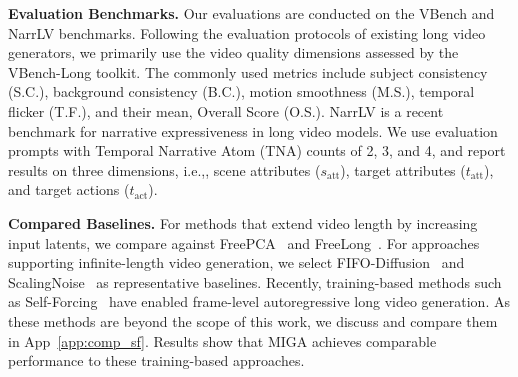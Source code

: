 \documentclass{llmxive}
\providecommand{\ie}{i.e.,\xspace}
\begin{document}
\textbf{Evaluation Benchmarks.}
Our evaluations are conducted on the VBench \cite{huang2024vbench} and NarrLV \cite {feng2025narrlv} benchmarks.  
Following the evaluation protocols of existing long video generators, we primarily use the video quality dimensions assessed by the VBench-Long toolkit.
The commonly used metrics include subject consistency (S.C.), background consistency (B.C.), motion smoothness (M.S.), temporal flicker (T.F.), and their mean, Overall Score (O.S.).
NarrLV is a recent benchmark for narrative expressiveness in long video models. 
We use evaluation prompts with Temporal Narrative Atom (TNA) counts of 2, 3, and 4, and report results on three dimensions, \ie, scene attributes ($s_{\text{att}}$), target attributes ($t_{\text{att}}$), and target actions ($t_{\text{act}}$).


\textbf{Compared Baselines.}
For methods that extend video length by increasing input latents, we compare against FreePCA~\cite{tan2025freepca} and FreeLong~\cite{lu2024freelong}. For approaches supporting infinite-length video generation, we select FIFO-Diffusion~\cite{kim2024fifo} and ScalingNoise~\cite{yang2025scalingnoise} as representative baselines.
Recently, training-based methods such as Self-Forcing~\cite{huang2025self} have enabled frame-level autoregressive long video generation. 
As these methods are beyond the scope of this work, we discuss and compare them in App~\ref{app:comp_sf}. 
Results show that MIGA achieves comparable performance to these training-based approaches.
\end{document}
